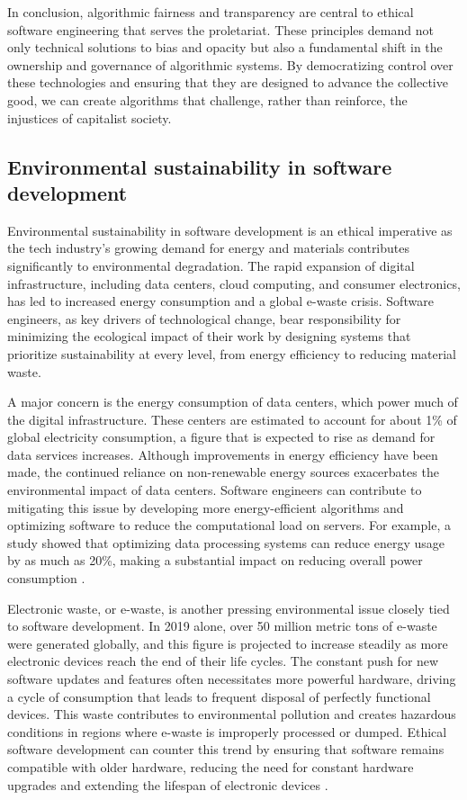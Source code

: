 \begin{refsection}
In conclusion, algorithmic fairness and transparency are central to ethical software engineering that serves the proletariat. These principles demand not only technical solutions to bias and opacity but also a fundamental shift in the ownership and governance of algorithmic systems. By democratizing control over these technologies and ensuring that they are designed to advance the collective good, we can create algorithms that challenge, rather than reinforce, the injustices of capitalist society.

\subsection{Environmental sustainability in software development}

Environmental sustainability in software development is an ethical imperative as the tech industry's growing demand for energy and materials contributes significantly to environmental degradation. The rapid expansion of digital infrastructure, including data centers, cloud computing, and consumer electronics, has led to increased energy consumption and a global e-waste crisis. Software engineers, as key drivers of technological change, bear responsibility for minimizing the ecological impact of their work by designing systems that prioritize sustainability at every level, from energy efficiency to reducing material waste.

A major concern is the energy consumption of data centers, which power much of the digital infrastructure. These centers are estimated to account for about 1\% of global electricity consumption, a figure that is expected to rise as demand for data services increases. Although improvements in energy efficiency have been made, the continued reliance on non-renewable energy sources exacerbates the environmental impact of data centers. Software engineers can contribute to mitigating this issue by developing more energy-efficient algorithms and optimizing software to reduce the computational load on servers. For example, a study showed that optimizing data processing systems can reduce energy usage by as much as 20\%, making a substantial impact on reducing overall power consumption \cite[pp.~120-122]{hilty2014}.

Electronic waste, or e-waste, is another pressing environmental issue closely tied to software development. In 2019 alone, over 50 million metric tons of e-waste were generated globally, and this figure is projected to increase steadily as more electronic devices reach the end of their life cycles. The constant push for new software updates and features often necessitates more powerful hardware, driving a cycle of consumption that leads to frequent disposal of perfectly functional devices. This waste contributes to environmental pollution and creates hazardous conditions in regions where e-waste is improperly processed or dumped. Ethical software development can counter this trend by ensuring that software remains compatible with older hardware, reducing the need for constant hardware upgrades and extending the lifespan of electronic devices \cite[pp.~65-67]{maxwell2012}.


\end{refsection}
